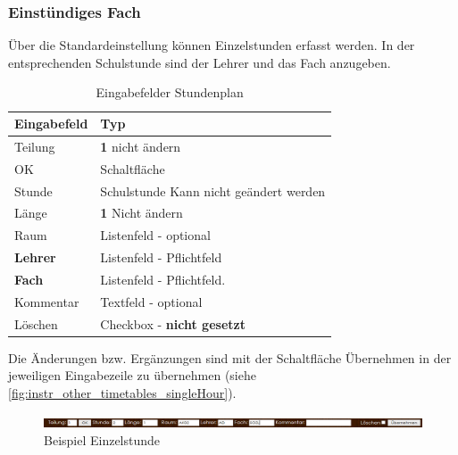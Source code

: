 \subsubsection{Einstündiges Fach} \label{sec:instr_other_timetables_single}
Über die Standardeinstellung können Einzelstunden erfasst werden. In der entsprechenden Schulstunde sind der Lehrer und das Fach anzugeben.
\begin{table}[H]
\centering
\begin{tabular}{p{3 cm}p{10 cm}}
   \toprule
   \textbf{Eingabefeld} & \textbf{Typ} \\
   \midrule
          Teilung & \textbf{1} \newline nicht ändern \\
          \hline
          OK & Schaltfläche \\
          \hline
          Stunde & Schulstunde \newline Kann nicht geändert werden\\
          \hline
          Länge & \textbf{1} \newline Nicht ändern \\
          \hline
          Raum & Listenfeld - optional \\
          \hline
          \textbf{Lehrer} & Listenfeld - Pflichtfeld \\
		  \hline
          \textbf{Fach} & Listenfeld - Pflichtfeld.\\
          \hline
          Kommentar & Textfeld - optional \\
          \hline
          Löschen & Checkbox - \textbf{nicht gesetzt}\\
   \bottomrule
\end{tabular}
\caption{Eingabefelder Stundenplan}
\end{table}
Die Änderungen bzw. Ergänzungen sind mit der Schaltfläche Übernehmen in der jeweiligen Eingabezeile zu übernehmen (siehe \autoref{fig:instr_other_timetables_singleHour}).
\begin{figure}[H]
\centering
\includegraphics[keepaspectratio=true, width=14cm]{images/screenshots/timetables_input_singleHour.png}
\caption{Beispiel Einzelstunde}
\label{fig:instr_other_timetables_singleHour}
\end{figure}
